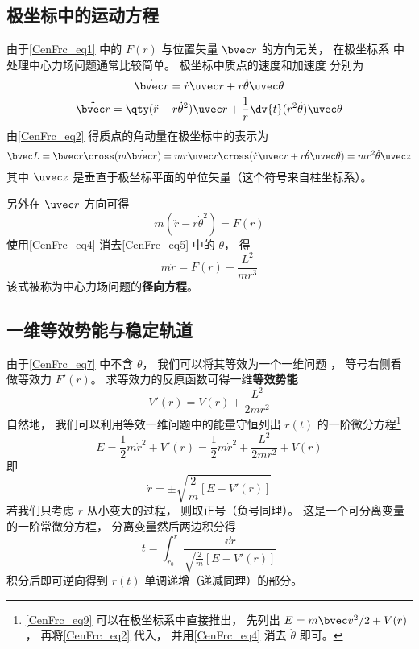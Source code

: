 \subsection{极坐标中的运动方程}
由于\autoref{CenFrc_eq1} 中的 $F(r)$ 与位置矢量 $\bvec r$ 的方向无关， 在极坐标系 中处理中心力场问题通常比较简单。 极坐标中质点的速度和加速度 分别为
\begin{equation}\label{CenFrc_eq2}
\dot{\bvec r} = \dot r \uvec r + r\dot\theta\uvec\theta
\end{equation}
\begin{equation}\label{CenFrc_eq3}
\ddot{\bvec r} = \qty(\ddot{r} - r \dot\theta^2)\uvec r + \frac 1r \dv{t} (r^2\dot\theta)\uvec \theta
\end{equation}
由\autoref{CenFrc_eq2} 得质点的角动量在极坐标中的表示为
\begin{equation}\label{CenFrc_eq4}
\bvec L = \bvec r \cross (m \dot{\bvec r})
= mr \uvec r \cross (\dot r \uvec r + r\dot\theta \uvec\theta)
= mr^2\dot \theta \uvec z
\end{equation}
其中 $\uvec z$ 是垂直于极坐标平面的单位矢量（这个符号来自柱坐标系）。 

另外在 $\uvec r$ 方向可得
\begin{equation}\label{CenFrc_eq5}
m(\ddot{r} - r \dot\theta^2) = F(r)
\end{equation}
使用\autoref{CenFrc_eq4} 消去\autoref{CenFrc_eq5} 中的 $\dot\theta$， 得
\begin{equation}\label{CenFrc_eq7}
m\ddot r = F(r) + \frac{L^2}{mr^3}
\end{equation}
该式被称为中心力场问题的\textbf{径向方程}。

\subsection{一维等效势能与稳定轨道}
由于\autoref{CenFrc_eq7} 中不含 $\theta$， 我们可以将其等效为一个一维问题%
， 等号右侧看做等效力 $F'(r)$。 求等效力的反原函数可得一维\textbf{等效势能}
\begin{equation}\label{CenFrc_eq6}
V'(r) = V(r) + \frac{L^2}{2mr^2}
\end{equation}
自然地， 我们可以利用等效一维问题中的能量守恒列出 $r(t)$ 的一阶微分方程\footnote{\autoref{CenFrc_eq9} 可以在极坐标系中直接推出， 先列出 $E = m\bvec v^2/2 + V(r)$， 再将\autoref{CenFrc_eq2} 代入， 并用\autoref{CenFrc_eq4} 消去 $\dot\theta$ 即可。}
\begin{equation}\label{CenFrc_eq9}
E = \frac 12 m\dot r^2 + V'(r) = \frac 12 m\dot r^2 + \frac{L^2}{2mr^2} + V(r)
\end{equation}
即
\begin{equation}\label{CenFrc_eq10}
\dot r = \pm\sqrt{\frac 2m [E - V'(r)]}
\end{equation}
若我们只考虑 $r$ 从小变大的过程， 则取正号（负号同理）。 这是一个可分离变量的一阶常微分方程， %
分离变量然后两边积分得
\begin{equation}\label{CenFrc_eq8}
t = \int_{r_0}^{r} \frac{\dd{r}}{\sqrt{\frac 2m [E - V'(r)]}}
\end{equation}
积分后即可逆向得到 $r(t)$ 单调递增（递减同理）的部分。

